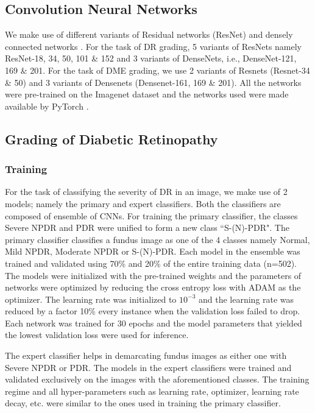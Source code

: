 \documentclass{paper}
\begin{document}
\subsection{Convolution Neural Networks}

We make use of different variants of Residual networks (ResNet) \cite{he2016identity} and densely connected networks \cite{huang2017densely}.  For the task of DR grading, 5 variants of ResNets namely ResNet-18, 34, 50, 101 \& 152 and 3 variants of DenseNets, i.e., DenseNet-121, 169 \& 201. For the task of DME grading, we use 2 variants of Resnets (Resnet-34 \& 50) and 3 variants of Densenets (Densenet-161, 169 \& 201). All the networks were pre-trained on the Imagenet dataset \cite{deng2009imagenet} and the networks used were made available by PyTorch \cite{paszke2017automatic}.

\subsection{Grading of Diabetic Retinopathy}
\subsubsection*{Training}

For the task of classifying the severity of DR in an image, we make use of 2 models; namely the primary and expert classifiers. Both the classifiers are composed of ensemble of CNNs. For training the primary classifier, the classes Severe NPDR and PDR were unified to form a new class ``S-(N)-PDR". The primary classifier classifies a fundus image as one of the 4 classes namely Normal, Mild NPDR, Moderate NPDR or S-(N)-PDR.  Each model in the ensemble was trained and validated using 70\% and 20\% of the entire training data (n=502). The models were initialized with the pre-trained weights and the parameters of networks were optimized by reducing the cross entropy loss with ADAM \cite{adam} as the optimizer. The learning rate was initialized to $10^{-3}$ and the learning rate was reduced by a factor 10\% every instance when the validation loss failed to drop. Each network was trained for 30 epochs and the model parameters that yielded the lowest validation loss were used for inference.
\par The expert classifier helps in demarcating fundus images as either one with Severe NPDR or PDR. The models in the expert classifiers were trained and validated exclusively on the images with the aforementioned classes. The training regime and all hyper-parameters such as learning rate, optimizer, learning rate decay, etc. were similar to the ones used in training the primary classifier.
\end{document}
